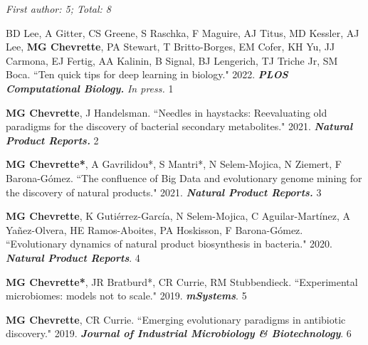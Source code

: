
 \vspace{-2mm}

\begin{cvpubs}

\cvpub
{\hspace{-1cm} \textit{First author: 5; Total: 8}}
{}

\cvpub
{BD Lee, A Gitter, CS Greene, S Raschka, F Maguire, AJ Titus, MD Kessler, AJ Lee, \textbf{MG Chevrette}, PA Stewart, T Britto-Borges, EM Cofer, KH Yu, JJ Carmona, EJ Fertig, AA Kalinin, B Signal, BJ Lengerich, TJ Triche Jr, SM Boca. ``Ten quick tips for deep learning in biology." 2022. \textbf{\textit{PLOS Computational Biology.}} \textit{In press.} \textit{\textbf{}}}
{1}

\cvpub
{\textbf{MG Chevrette}, J Handelsman. ``Needles in haystacks: Reevaluating old paradigms for the discovery of bacterial secondary metabolites." 2021. \textit{\textbf{Natural Product Reports.}} \textbf{\textit{}}}
{2}

\cvpub
{\textbf{MG Chevrette*}, A Gavrilidou*, S Mantri*, N Selem-Mojica, N Ziemert, F Barona-G\'{o}mez. ``The confluence of Big Data and evolutionary genome mining for the discovery of natural products." 2021. \textit{\textbf{Natural Product Reports.}} \textbf{\textit{}}}
{3}

\cvpub
{\textbf{MG Chevrette}, K Guti\'{e}rrez-Garc\'{i}a, N Selem-Mojica, C Aguilar-Mart\'{i}nez, A Ya\~{n}ez-Olvera, HE Ramos-Aboites, PA Hoskisson, F Barona-G\'{o}mez. ``Evolutionary dynamics of natural product biosynthesis in bacteria." 2020. \textit{\textbf{Natural Product Reports}}. \textbf{\textit{}}}
{4}

\cvpub
{\textbf{MG Chevrette*}, JR Bratburd*, CR Currie, RM Stubbendieck. ``Experimental microbiomes: models not to scale." 2019. \textit{\textbf{mSystems}}. \textbf{\textit{}}}
{5}

\cvpub
{\textbf{MG Chevrette}, CR Currie. ``Emerging evolutionary paradigms in antibiotic discovery." 2019. \textit{\textbf{Journal of Industrial Microbiology \& Biotechnology}}. \textbf{\textit{}}}
{6}


\end{cvpubs}

